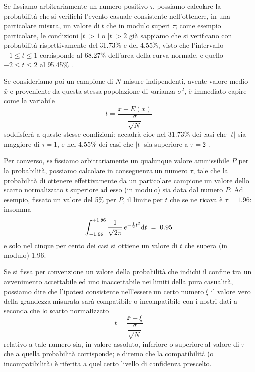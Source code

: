 Se fissiamo arbitrariamente un numero positivo $\tau$,
possiamo calcolare la probabilit\`a che si verifichi
l'evento casuale consistente nell'ottenere, in una
particolare misura, un valore di $t$ che in modulo
superi $\tau$; come esempio particolare, le condizioni
$|t| > 1$ o $|t|> 2$ gi\`a sappiamo che si verificano
con probabilit\`a rispettivamente del 31.73\% e del
4.55\%, visto che l'intervallo $-1 \leq t \leq 1$
corrisponde al 68.27\% dell'area della curva normale, e
quello $-2 \leq t \leq 2$ al 95.45\% .

Se consideriamo poi un campione di $N$ misure indipendenti,
avente valore medio $\bar x$ e proveniente da questa stessa
popolazione di varianza $\sigma^2$, \`e immediato capire
come la variabile
\begin{equation*}
  t = \frac{\bar x - E(x)}{\dfrac{\sigma}{\sqrt{N}}}
\end{equation*}
soddisfer\`a a queste stesse condizioni: accadr\`a cio\`e
nel 31.73\% dei casi che $|t|$ sia maggiore di $\tau=1$, e
nel 4.55\% dei casi che $|t|$ sia superiore a $\tau=2$ .

Per converso, se fissiamo arbitrariamente un qualunque
valore ammissibile $P$ per la probabilit\`a, possiamo
calcolare in conseguenza un numero $\tau$, tale che la
probabilit\`a di ottenere effettivamente da un particolare
campione un valore dello scarto normalizzato $t$ superiore
ad esso (in modulo) sia data dal numero $P$.  Ad esempio,
fissato un valore del 5\% per $P$, il limite per $t$ che se
ne ricava \`e $\tau = 1.96$: insomma
\begin{equation*}
  \int_{-1.96}^{+1.96} \frac{1}{\sqrt{2 \pi}} \,
    e^{- \frac{1}{2} t^2} \mathrm{d} t
    \; = \; 0.95
\end{equation*}
e solo nel cinque per cento dei casi si ottiene un valore di
$t$ che supera (in modulo) 1.96.

Se si fissa per convenzione un valore della probabilit\`a
che indichi il confine tra un avvenimento accettabile ed uno
inaccettabile nei limiti della pura casualit\`a, possiamo
dire che l'ipotesi consistente nell'essere un certo numero
$\xi$ il valore vero della grandezza misurata sar\`a
compatibile o incompatibile con i nostri dati a seconda che
lo scarto normalizzato
\begin{equation*}
  t = \frac{\bar x - \xi}{\dfrac{\sigma}{\sqrt{N}}}
\end{equation*}
relativo a tale numero sia, in valore assoluto, inferiore o
superiore al valore di $\tau$ che a quella probabilit\`a
corrisponde; e diremo che la compatibilit\`a (o
incompatibilit\`a) \`e riferita a quel certo livello di
confidenza prescelto.

